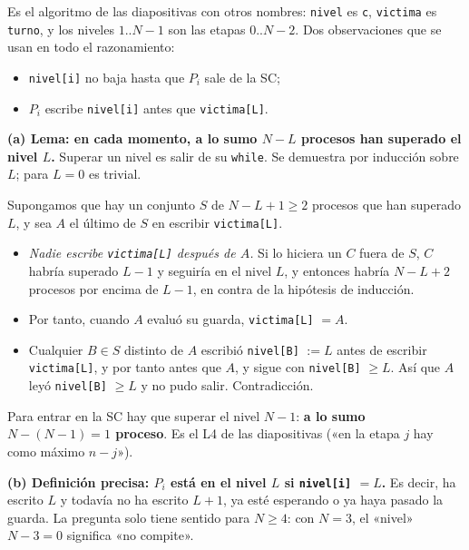\documentclass[11pt,a4paper,oneside]{report}
\begin{document}
\begin{solucion}
Es el algoritmo de las diapositivas con otros nombres: \texttt{nivel} es \texttt{c}, \texttt{victima} es
\texttt{turno}, y los niveles $1..N-1$ son las etapas $0..N-2$. Dos observaciones que se usan en todo el
razonamiento:
\begin{itemize}[leftmargin=*,noitemsep]
  \item \texttt{nivel[i]} no baja hasta que $P_i$ sale de la SC;
  \item $P_i$ escribe \texttt{nivel[i]} antes que \texttt{victima[L]}.
\end{itemize}

\textbf{(a) Lema: en cada momento, a lo sumo $N - L$ procesos han superado el nivel $L$.} Superar un nivel es salir
de su \texttt{while}. Se demuestra por inducción sobre $L$; para $L = 0$ es trivial.

Supongamos que hay un conjunto $S$ de $N - L + 1 \ge 2$ procesos que han superado $L$, y sea $A$ el último de $S$
en escribir \texttt{victima[L]}.
\begin{itemize}[leftmargin=*,noitemsep]
  \item \emph{Nadie escribe \texttt{victima[L]} después de $A$.} Si lo hiciera un $C$ fuera de $S$, $C$ habría
        superado $L-1$ y seguiría en el nivel $L$, y entonces habría $N-L+2$ procesos por encima de $L-1$, en
        contra de la hipótesis de inducción.
  \item Por tanto, cuando $A$ evaluó su guarda, \texttt{victima[L]} $= A$.
  \item Cualquier $B \in S$ distinto de $A$ escribió \texttt{nivel[B]} $:= L$ antes de escribir
        \texttt{victima[L]}, y por tanto antes que $A$, y sigue con \texttt{nivel[B]} $\ge L$. Así que $A$ leyó
        \texttt{nivel[B]} $\ge L$ y no pudo salir. Contradicción.
\end{itemize}
Para entrar en la SC hay que superar el nivel $N-1$: \textbf{a lo sumo $N - (N-1) = 1$ proceso}. Es el L4 de las
diapositivas («en la etapa $j$ hay como máximo $n - j$»).

\textbf{(b) Definición precisa: $P_i$ está en el nivel $L$ si \texttt{nivel[i]} $= L$.} Es decir, ha escrito $L$ y
todavía no ha escrito $L + 1$, ya esté esperando o ya haya pasado la guarda. La pregunta solo tiene sentido para
$N \ge 4$: con $N = 3$, el «nivel» $N - 3 = 0$ significa «no compite».


\end{solucion}
\end{document}
